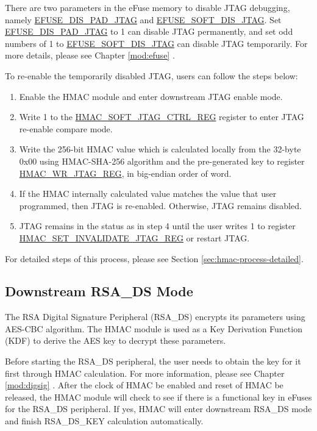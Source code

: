 \documentclass[main\_\_EN.tex]{subfiles}
\begin{document}
There are two parameters in the eFuse memory to disable JTAG debugging, namely \hyperref[fielddesc:EFUSEDISPADJTAG]{EFUSE\_DIS\_PAD\_JTAG} and \hyperref[fielddesc:EFUSESOFTDISJTAG]{EFUSE\_SOFT\_DIS\_JTAG}. Set \hyperref[fielddesc:EFUSEDISPADJTAG]{EFUSE\_DIS\_PAD\_JTAG} to 1 can disable JTAG permanently, and set odd numbers of 1 to \hyperref[fielddesc:EFUSESOFTDISJTAG]{EFUSE\_SOFT\_DIS\_JTAG} can disable JTAG temporarily. For more details, please see Chapter \ref{mod:efuse} \textit{}.

To re-enable the temporarily disabled JTAG, users can follow the steps below:

\begin{enumerate}
\item Enable the HMAC module and enter downstream JTAG enable mode.
\item Write 1 to the \hyperref[regdesc:HMACSOFTJTAGCTRLREG]{HMAC\_SOFT\_JTAG\_CTRL\_REG} register to enter JTAG re-enable compare mode.
\item Write the 256-bit HMAC value which is calculated locally from the 32-byte 0x{}00 using HMAC-SHA-256 algorithm and the pre-generated key to register \hyperref[regdesc:HMACWRJTAGREG]{HMAC\_WR\_JTAG\_REG}, in big-endian order of word.
\item If the HMAC internally calculated value matches the value that user programmed, then JTAG is re-enabled. Otherwise, JTAG remains disabled.
\item JTAG remains in the status as in step 4 until the user writes 1 to register \hyperref[regdesc:HMACSETINVALIDATEJTAGREG]{HMAC\_SET\_INVALIDATE\_JTAG\_REG} or restart JTAG.
\end{enumerate}

For detailed steps of this process, please see Section \ref{sec:hmac-process-detailed}.

\subsection{Downstream RSA\_DS Mode}

The RSA Digital Signature Peripheral (RSA\_DS) encrypts its parameters using AES-CBC algorithm. The HMAC module is used as a Key Derivation Function (KDF) to derive the AES key to decrypt these parameters.

Before starting the RSA\_DS peripheral, the user needs to obtain the key for it first through HMAC calculation. For more information, please see Chapter \ref{mod:digsig} \textit{}. After the clock of HMAC be enabled and reset of HMAC be released, the HMAC module will check to see if there is a functional key in eFuses for the RSA\_DS peripheral. If yes, HMAC will enter downstream RSA\_DS mode and finish RSA\_DS\_KEY calculation automatically.
\end{document}
